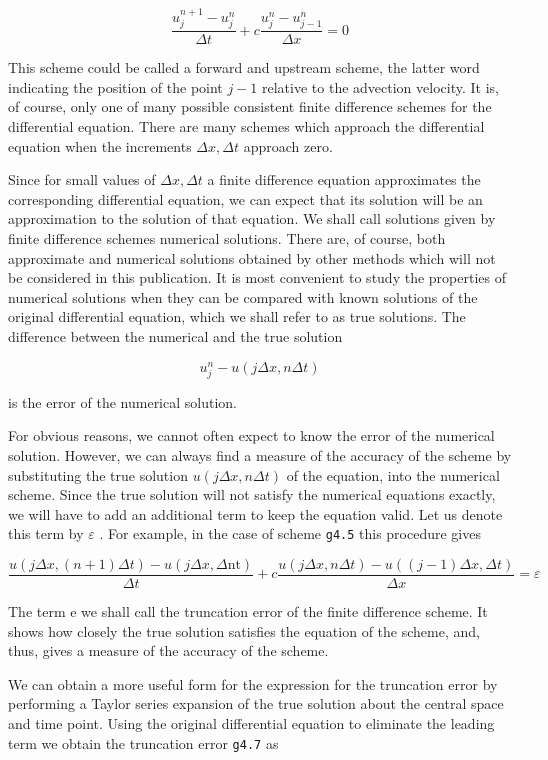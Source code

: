     {\[\frac{u_{j}^{n + 1} - u_{j}^{n}}{\Delta t} + c\frac{u_j^n - u_{j - 1}^n}{\Delta x} = 0\]}

This scheme could be called a forward and upstream scheme, the latter
word indicating the position of the point \(j - 1\) relative to the
advection velocity. It is, of course, only one of many possible
consistent finite difference schemes for the differential equation.
There are many schemes which approach the differential equation when the
increments \(\Delta x,\Delta t\) approach zero.

Since for small values of \(\Delta x,\Delta t\) a finite difference
equation approximates the corresponding differential equation, we can
expect that its solution will be an approximation to the solution of
that equation. We shall call solutions given by finite difference
schemes numerical solutions. There are, of course, both approximate and
numerical solutions obtained by other methods which will not be
considered in this publication. It is most convenient to study the
properties of numerical solutions when they can be compared with known
solutions of the original differential equation, which we shall refer to
as true solutions. The difference between the numerical and the true
solution

    {\[u_{j}^{n}-u ( j\Delta x,n\Delta t )\]}

is the error of the numerical solution.

For obvious reasons, we cannot often expect to know the error of the
numerical solution. However, we can always find a measure of the
accuracy of the scheme by substituting the true solution
\(u \left( j\Delta x,n\Delta t \right)\) of the equation, into the
numerical scheme. Since the true solution will not satisfy the numerical
equations exactly, we will have to add an additional term to keep the
equation valid. Let us denote this term by \(\varepsilon\) . For
example, in the case of scheme \texttt{g4.5} this procedure gives

    {\[\frac{u\left( j\Delta x,( n + 1 )\Delta t \right)
    - u\left( j\Delta x,\Delta\text{nt} \right)}{\Delta t}
+ c\frac{u\left( j\Delta x,n\Delta t \right)
- u\left( \left( j - 1 \right)\Delta x,\Delta t \right)}{\Delta x} = \varepsilon\]}

The term e we shall call the truncation error of the finite difference
scheme. It shows how closely the true solution satisfies the equation of
the scheme, and, thus, gives a measure of the accuracy of the scheme.

We can obtain a more useful form for the expression for the truncation
error by performing a Taylor series expansion of the true solution about
the central space and time point. Using the original differential
equation to eliminate the leading term we obtain the truncation error
\texttt{g4.7} as


